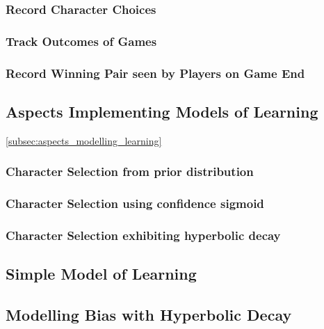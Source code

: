 \subsubsection{Record Character Choices}

\subsubsection{Track Outcomes of Games}

\subsubsection{Record Winning Pair seen by Players on Game End}


\subsection{Aspects Implementing Models of Learning}\cref{subsec:aspects_modelling_learning}

\subsubsection{Character Selection from prior distribution}

\subsubsection{Character Selection using confidence sigmoid}

\subsubsection{Character Selection exhibiting hyperbolic decay}




\subsection{Simple Model of Learning}\label{subsec:optimisation_with_aspects_basiclearningaspect}





\subsection{Modelling Bias with Hyperbolic Decay}\label{subsec:optimisation_with_aspects_hyperbolicdecay}

